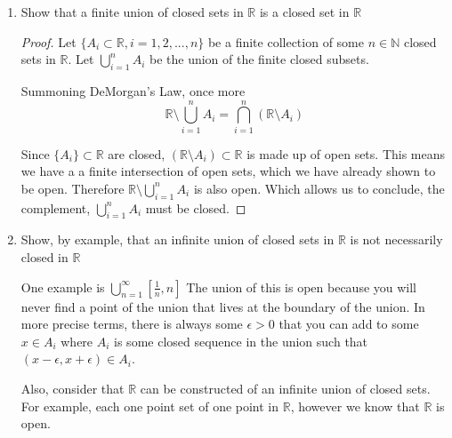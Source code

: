 \documentclass{tufte-book}
\theoremstyle{mytheoremstyle}
\theoremstyle{mylemstyle}
\theoremstyle{mydefstyle}
\begin{document}
\begin{enumerate}
\begin{proof}
By definition $\mathbb{R} \setminus \bigcap\limits_{i \in I} A_i = \bigcup\limits_{i \in I} (\mathbb{R} \setminus A_i)$.

Since $\{A_i\} \subset \mathbb{R}$ are closed, $(\mathbb{R} \setminus A_i) \subset \mathbb{R}$ is made up of open sets.  So we have an arbitrary union of open sets in $\mathbb{R}$ which we have already shown to be open.  This means  $\mathbb{R} \setminus \bigcap\limits_{i \in I} A_i$ is also open.  Therefore it's compliment $\bigcap\limits_{i \in I}A_i$ is closed.

\end{proof}

\item Show that a finite union of closed sets in $\mathbb{R}$ is a closed set in $\mathbb{R}$ 
\begin{proof}

Let $\{A_i \subset \mathbb{R}, i=1, 2,...,n\}$ be a finite collection of some $n \in \mathbb{N}$ closed sets in $\mathbb{R}$.  Let $\bigcup\limits_{i=1}^{n}A_i$ be the union of the finite closed subsets.

Summoning DeMorgan's Law, once more
\[\mathbb{R} \setminus \bigcup\limits_{i=1}^{n} A_i = \bigcap\limits_{i=1}^{n}(\mathbb{R} \setminus A_i)\]

Since $\{A_i\} \subset \mathbb{R}$ are closed, $(\mathbb{R} \setminus A_i) \subset \mathbb{R}$ is made up of open sets.  This means we have a a finite intersection of open sets, which we have already shown to be open.  Therefore $\mathbb{R} \setminus \bigcup\limits_{i=1}^{n} A_i $ is also open.  Which allows us to conclude, the complement,  $\bigcup\limits_{i=1}^{n} A_i $ must be closed.

\end{proof}

\item Show, by example, that an infinite union of closed sets in $\mathbb{R}$ is not necessarily closed in $\mathbb{R}$

One example is $\bigcup\limits_{n=1}^{\infty}[\frac{1}{n}, n]$  The union of this is open because you will never find a point of the union that lives at the boundary of the union.  In more precise terms, there is always some $\epsilon > 0$ that you can add to some $x \in A_i$ where $A_i$ is some closed sequence in the union such that $(x - \epsilon, x+\epsilon) \in A_i$.

Also, consider that $\mathbb{R}$ can be constructed of an infinite union of closed sets.   For example, each one point set of one point in $\mathbb{R}$, however we know that $\mathbb{R}$ is open.
\end{enumerate}
\end{document}
